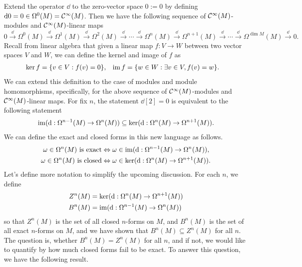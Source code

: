 Extend the operator \(\dd\) to the zero-vector space \(0 := \qty{0}\) by defining \(\dd 0 = 0 \in \Omega^0(M) = \mathcal C^\infty(M)\). Then we have the following sequence of \(\mathcal C^\infty(M)\)-modules and \(\mathcal C^\infty(M)\)-linear maps
\begin{equation*}
    0 \xrightarrow{\ \dd\ } \Omega^0(M) \xrightarrow{\ \dd\ } \Omega^1(M) \xrightarrow{\ \dd\ } \Omega^2(M) \xrightarrow{\ \dd\ } \cdots \xrightarrow{\ \dd\ } \Omega^n(M) \xrightarrow{\ \dd\ } \Omega^{n+1}(M) \xrightarrow{\ \dd\ } \cdots \xrightarrow{\ \dd\ } \Omega^{\dim M}(M) \xrightarrow{\ \dd\ } 0.
\end{equation*}
Recall from linear algebra that given a linear map \(f: V \to W\) between two vector spaces \(V\) and \(W\), we can define the kernel and image of \(f\) as
\begin{align*}
    \ker{f} & = \qty{v \in V: f(v) = 0},                  &
    \operatorname{im}{f}  & = \qty{w \in W: \exists v \in V, f(v) = w}.
\end{align*}
We can extend this definition to the case of modules and module homomorphisms, specifically, for the above sequence of \(\mathcal C^\infty(M)\)-modules and \(\mathcal C^\infty(M)\)-linear maps. For fix \(n\), the statement \(\dd[2] = 0\) is equivalent to the following statement
\begin{equation*}
    \operatorname{im}(\dd: \Omega^{n-1}(M) \to \Omega^n(M)) \subseteq \ker(\dd: \Omega^n(M) \to \Omega^{n+1}(M)).
\end{equation*}
We can define the exact and closed forms in this new language as follows.
\begin{align*}
    \omega \in \Omega^n(M) \text{ is exact}  & \Leftrightarrow \omega \in \operatorname{im}(\dd: \Omega^{n-1}(M) \to \Omega^n(M)),  \\
    \omega \in \Omega^n(M) \text{ is closed} & \Leftrightarrow \omega \in \ker(\dd: \Omega^n(M) \to \Omega^{n+1}(M)).
\end{align*}
Let's define more notation to simplify the upcoming discussion. For each \(n\), we define
\begin{align*}
    Z^n(M) & = \ker(\dd: \Omega^n(M) \to \Omega^{n+1}(M)) \\
    B^n(M) & = \operatorname{im}(\dd: \Omega^{n-1}(M) \to \Omega^n(M))
\end{align*}
so that \(Z^n(M)\) is the set of all closed \(n\)-forms on \(M\), and \(B^n(M)\) is the set of all exact \(n\)-forms on \(M\), and we have shown that \(B^n(M) \subseteq Z^n(M)\) for all \(n\). The question is, whether \(B^n(M) = Z^n(M)\) for all \(n\), and if not, we would like to quantify by how much closed forms fail to be exact. To answer this question, we have the following result.
